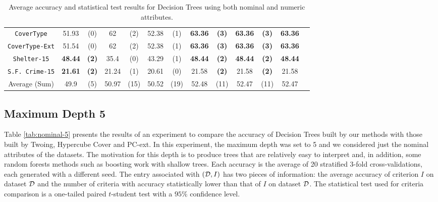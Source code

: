 \begin{table}
\begin{tabular}{c|cc|cc|cc|cc|cc|cc}
{\tt CoverType}    & 51.93          &  (0)      & 62         & (2)          & 52.38       &  (1)              & {\bf 63.36} &  {\bf (3)}   & {\bf 63.36} & {\bf (3)}& {\bf 63.36} &           \\  
{\tt CoverType-Ext}& 51.54          &  (0)      & 62         & (2)          & 52.38       &  (1)              & {\bf 63.36} &  {\bf (3)}   & {\bf 63.36} & {\bf (3)}& {\bf 63.36} &           \\  
{\tt Shelter-15}   & {\bf 48.44}    & {\bf (2)} & 35.4       & (0)          & 43.29       &  (1)              & {\bf 48.44} &  {\bf (2)}   & {\bf 48.44} & {\bf (2)}& {\bf 48.44} &           \\   
{\tt S.F. Crime-15}& {\bf 21.61}    & {\bf (2)} & 21.24      & (1)          & 20.61       &  (0)              & 21.58       &  {\bf (2)}   & 21.58       & {\bf (2)}& 21.58       &           \\ 
\hline
Average (Sum)      & 49.9           &  (5)      & 50.97      & (15)         & 50.52       &  (19)             & 52.48       &  (11)        & 52.47       &  (11)    & 52.47       &

\end{tabular}
\caption{Average accuracy and statistical test results for  Decision Trees using both nominal and numeric attributes.}
\label{exp:numeric-1}
\normalsize
\end{table}



\subsection{Maximum Depth 5}
\label{subsec:depth-5}

Table \ref{tab:nominal-5} presents  the results of an experiment to
compare the accuracy of  Decision Trees built by  our methods with those built by Twoing, Hypercube Cover and PC-ext.
In this experiment, the maximum depth was set to 5 and we considered just the nominal attributes of the datasets. 
The motivation for this depth is to produce trees that
are relatively easy to interpret and, in addition, some random
forests methods such as boosting work with shallow trees.
Each accuracy is the average of 20 stratified 3-fold cross-validations,
each generated with a different seed.
The entry  associated with  $({\cal D},I)$ has two pieces of information: the average accuracy
of criterion $I$ on dataset ${\cal D}$ and the number of criteria
with accuracy   statistically lower than that of $I$ on dataset ${\cal D}$. 
The statistical test used for criteria comparison is a  one-tailed paired $t$-student test with a $95\% $ confidence level.

